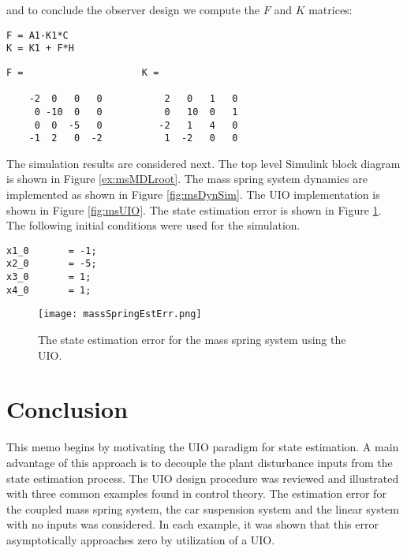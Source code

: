 \documentclass{amsart}
\theoremstyle{definition}
\theoremstyle{remark}
\numberwithin{equation}{section}
\begin{document}
and to conclude the observer design we compute the $F$ and $K$ matrices:
    \begin{verbatim}
F = A1-K1*C
K = K1 + F*H
\end{verbatim}

        \color{lightgray} \begin{verbatim}
F =                     K = 

    -2  0   0   0           2   0   1   0
     0 -10  0   0           0   10  0   1
     0  0  -5   0          -2   1   4   0
    -1  2   0  -2           1  -2   0   0 
\end{verbatim} \color{black}
The simulation results are considered next.  The top level Simulink block diagram is shown in Figure \ref{ex:msMDLroot}.  The mass spring system dynamics are implemented as shown in Figure \ref{fig:msDynSim}. The UIO implementation is shown in Figure \ref{fig:msUIO}. The state estimation error is shown in Figure \ref{fig:UIOerr}. The following initial conditions were used for the simulation. 

\begin{verbatim}
x1_0       = -1;
x2_0       = -5;
x3_0       = 1;
x4_0       = 1; 
\end{verbatim}

\begin{figure}[H]
    \centering
    \texttt{[image: massSpringEstErr.png]}
    \caption{The state estimation error for the mass spring system using the UIO.}
    \label{fig:UIOerr}
\end{figure}
\section{Conclusion}
This memo begins by motivating the UIO paradigm for state estimation.  A main advantage of this approach is to decouple the plant disturbance inputs from the state estimation process.  The UIO design procedure was reviewed and illustrated with three common examples found in control theory.  The estimation error for the coupled mass spring system, the car suspension system and the linear system with no inputs was considered. In each example, it was shown that this error asymptotically approaches zero by utilization of a UIO.












\end{document}
